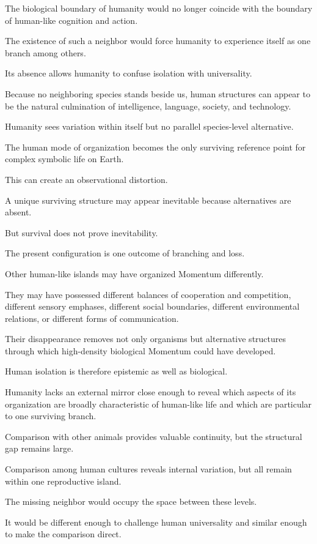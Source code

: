 The biological boundary of humanity would no longer coincide with the boundary of human-like cognition and action.

The existence of such a neighbor would force humanity to experience itself as one branch among others.

Its absence allows humanity to confuse isolation with universality.

Because no neighboring species stands beside us, human structures can appear to be the natural culmination of intelligence, language, society, and technology.

Humanity sees variation within itself but no parallel species-level alternative.

The human mode of organization becomes the only surviving reference point for complex symbolic life on Earth.

This can create an observational distortion.

A unique surviving structure may appear inevitable because alternatives are absent.

But survival does not prove inevitability.

The present configuration is one outcome of branching and loss.

Other human-like islands may have organized Momentum differently.

They may have possessed different balances of cooperation and competition, different sensory emphases, different social boundaries, different environmental relations, or different forms of communication.

Their disappearance removes not only organisms but alternative structures through which high-density biological Momentum could have developed.

Human isolation is therefore epistemic as well as biological.

Humanity lacks an external mirror close enough to reveal which aspects of its organization are broadly characteristic of human-like life and which are particular to one surviving branch.

Comparison with other animals provides valuable continuity, but the structural gap remains large.

Comparison among human cultures reveals internal variation, but all remain within one reproductive island.

The missing neighbor would occupy the space between these levels.

It would be different enough to challenge human universality and similar enough to make the comparison direct.

